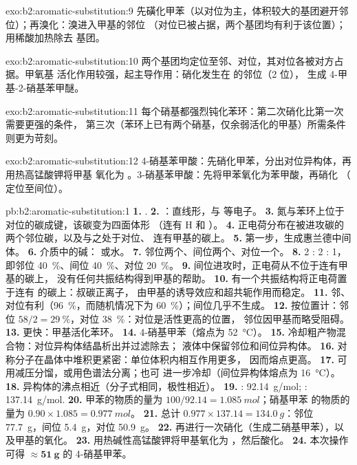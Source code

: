 \begin{solution}{exo:b2:aromatic-substitution:9}
先磺化甲苯（以对位为主，体积较大的基团避开邻位）；再溴化：溴进入甲基的邻位
（对位已被占据，两个基团均有利于该位置）；
用稀酸加热除去  基团。
\end{solution}

\begin{solution}{exo:b2:aromatic-substitution:10}
两个基团均定位至邻、对位，其对位各被对方占据。甲氧基
活化作用较强，起主导作用：硝化发生在  的邻位（2 位），
生成 4-甲基-2-硝基苯甲醚。
\end{solution}

\begin{solution}{exo:b2:aromatic-substitution:11}
每个硝基都强烈钝化苯环：第二次硝化比第一次需要更强的条件，
第三次（苯环上已有两个硝基，仅余弱活化的甲基）所需条件
则更为苛刻。
\end{solution}

\begin{solution}{exo:b2:aromatic-substitution:12}
4-硝基苯甲酸：先硝化甲苯，分出对位异构体，再用热高锰酸钾将甲基
氧化为 。3-硝基苯甲酸：先将甲苯氧化为苯甲酸，再硝化
（ 定位至间位）。
\end{solution}

\begin{solution}{pb:b2:aromatic-substitution:1}
\textbf{1.} .
\textbf{2.} ：直线形，与  等电子。
\textbf{3.} 氮与苯环上位于  对位的碳成键，该碳变为四面体形
（连有 H 和 ）。
\textbf{4.} 正电荷分布在被进攻碳的两个邻位碳，以及与之处于对位、
连有甲基的碳上。
\textbf{5.} 第一步，生成惠兰德中间体。
\textbf{6.} 介质中的碱： 或水。
\textbf{7.} 邻位两个、间位两个、对位一个。
\textbf{8.} 2 : 2 : 1，即邻位 40~\%、间位 40~\%、对位 20~\%。
\textbf{9.} 间位进攻时，正电荷从不位于连有甲基的碳上，
没有任何共振结构得到甲基的帮助。
\textbf{10.} 有一个共振结构将正电荷置于连有  的碳上：叔碳正离子，
由甲基的诱导效应和超共轭作用而稳定。
\textbf{11.} 邻、对位有利（96~\%，而随机情况下为 60~\%）；间位几乎不生成。
\textbf{12.} 按位置计：邻位 $58/2 = 29~\%$，对位 38~\%：对位是活性更高的位置，
邻位因甲基而略受阻碍。
\textbf{13.} 更快：甲基活化苯环。
\textbf{14.} 4-硝基甲苯（熔点为 \qty{52}{\degreeCelsius}）。
\textbf{15.} 冷却粗产物混合物：对位异构体结晶析出并过滤除去；
液体中保留邻位和间位异构体。
\textbf{16.} 对称分子在晶体中堆积更紧密：单位体积内相互作用更多，
因而熔点更高。
\textbf{17.} 可用减压分馏，或用色谱法分离；也可
进一步冷却（间位异构体熔点为 \qty{16}{\degreeCelsius}）。
\textbf{18.} 异构体的沸点相近（分子式相同，极性相近）。
\textbf{19.} : \qty{92.14}{g/mol}; : \qty{137.14}{g/mol}.
\textbf{20.} 甲苯的物质的量为 $100/92.14 = \qty{1.085}{mol}$；硝基甲苯
的物质的量为 $0.90 \times 1.085 = \qty{0.977}{mol}$。
\textbf{21.} 总计 $0.977 \times 137.14 = \qty{134.0}{g}$：邻位 \qty{77.7}{g}，间位
\qty{5.4}{g}，对位 \qty{50.9}{g}。
\textbf{22.} 再进行一次硝化（生成二硝基甲苯），以及甲基的氧化。
\textbf{23.} 用热碱性高锰酸钾将甲基氧化为 ，然后酸化。
\textbf{24.} 本次操作可得 $\boldsymbol{\approx \qty{51}{g}}$ 的 4-硝基甲苯。
\end{solution}
